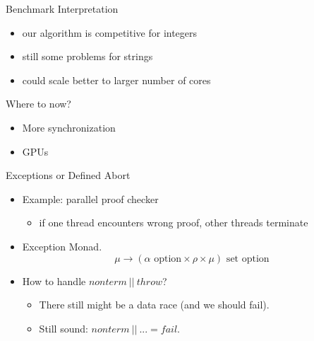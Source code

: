 \documentclass[fleqn]{beamer}
\begin{document}
\begin{frame}{Benchmark Interpretation}
  \begin{itemize}
   \item our algorithm is competitive for integers
   \item still some problems for strings
   \item could scale better to larger number of cores


  \end{itemize}
\end{frame}
\begin{frame}{Where to now?}
  \begin{itemize}
   \item More synchronization
   \item GPUs


  \end{itemize}
\end{frame}
\begin{frame}{Exceptions or Defined Abort}
  \begin{itemize}
   \item Example: parallel proof checker
    \begin{itemize}
     \item if one thread encounters wrong proof, other threads terminate
    \end{itemize}
   \item Exception Monad.
    \[ \mu \to (\alpha \textrm{ option}\times\rho\times\mu) \textrm{ set option}
    \]

   \item How to handle $nonterm~||~throw$?
    \begin{itemize}
     \item There still might be a data race (and we should fail).
     \item Still sound: $nonterm~||~... = fail$.

    \end{itemize}
  \end{itemize}
\end{frame}
\end{document}
